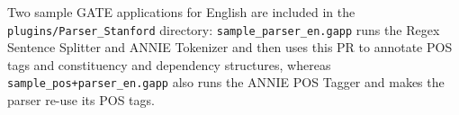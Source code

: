 Two sample GATE applications for English are included in the
\texttt{plugins/Parser\_Stanford} directory: \verb!sample_parser_en.gapp! runs
the Regex Sentence Splitter and ANNIE Tokenizer and then uses this PR to
annotate POS tags and constituency and dependency structures, whereas
\verb!sample_pos+parser_en.gapp! also runs the ANNIE POS Tagger and makes the
parser re-use its POS tags.
